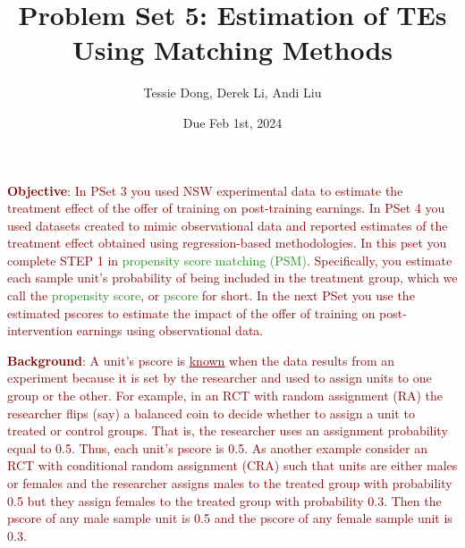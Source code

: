 \documentclass[
]{article}
\title{Problem Set 5: Estimation of TEs Using Matching Methods}
\author{Tessie Dong, Derek Li, Andi Liu}
\date{Due Feb 1st, 2024}
\begin{document}
\maketitle

\newlength{\dhatheight}
\newcommand{\doublehat}[1]{%
    \settoheight{\dhatheight}{\ensuremath{\hat{#1}}}%
    \addtolength{\dhatheight}{-0.35ex}%
    \hat{\vphantom{\rule{1pt}{\dhatheight}}%
    \smash{\hat{#1}}}}

\noindent \textcolor{Maroon}{\textbf{Objective}: In PSet 3 you used NSW experimental data to estimate the treatment effect of the offer of training on post-training earnings. In PSet 4 you used datasets created to mimic observational data and reported estimates of the treatment effect obtained using regression-based methodologies. In this pset you complete STEP 1 in \textcolor{ForestGreen}{propensity score matching (PSM)}. Specifically, you estimate each sample unit's probability of being included in the treatment group, which we call the \textcolor{ForestGreen}{propensity score}, or \textcolor{ForestGreen}{pscore} for short. In the next PSet you use the estimated pscores to estimate the impact of the offer of training on post-intervention earnings using observational data.}

\noindent \textcolor{Maroon}{\textbf{Background}: A unit's pscore is \underline{known} when the data results from an experiment because it is set by the researcher and used to assign units to one group or the other. For example, in an RCT with random assignment (RA) the researcher flips (say) a balanced coin to decide whether to assign a unit to treated or control groups. That is, the researcher uses an assignment probability equal to 0.5. Thus, each unit's pscore is 0.5. As another example consider an RCT with conditional random assignment (CRA) such that units are either males or females and the researcher assigns males to the treated group with probability 0.5 but they assign females to the treated group with probability 0.3. Then the pscore of any male sample unit is 0.5 and the pscore of any female sample unit is 0.3.}
\end{document}
